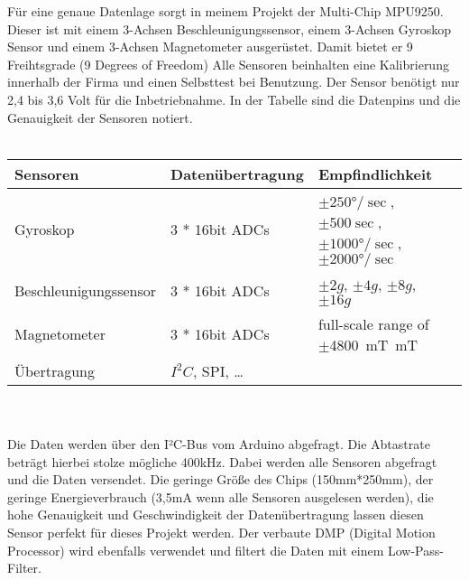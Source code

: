 Für eine genaue Datenlage sorgt in meinem Projekt der Multi-Chip MPU9250. Dieser ist mit 
einem 3-Achsen Beschleunigungssensor, einem 3-Achsen Gyroskop Sensor und einem 3-Achsen 
Magnetometer ausgerüstet. Damit bietet er 9 Freihtsgrade (9 Degrees of Freedom)
Alle Sensoren beinhalten eine Kalibrierung innerhalb der 
Firma und einen Selbsttest bei Benutzung. Der Sensor benötigt nur 2,4 bis 3,6 Volt für die 
Inbetriebnahme. In der Tabelle sind die Datenpins und die Genauigkeit der Sensoren notiert.\\
\\
\begin{tabularx}{0.8\textwidth}{l|X|XX}
Sensoren & Datenübertragung & Empfindlichkeit                                     \\
\hline
Gyroskop & 3 * 16bit ADCs & $\pm250°/\sec$, $\pm500\sec$, $\pm1000°/\sec$, $\pm2000°/\sec$\\ 
\hline
Beschleunigungssensor & 3 * 16bit ADCs & $\pm2g$, $\pm4g$, $\pm8g$, $\pm16g$\\
\hline
Magnetometer & 3 * 16bit ADCs & full-scale range of $\pm$\SI{4800}{\milli\tesla\meter}T \\
\hline
Übertragung & $I^2C$, SPI, \dots & \\
\end{tabularx}
\\
\\
Die Daten werden über den I²C-Bus vom Arduino abgefragt. Die Abtastrate beträgt hierbei 
stolze mögliche 400kHz. Dabei werden alle Sensoren abgefragt und die Daten versendet.
Die geringe Größe des Chips (150mm*250mm), der geringe Energieverbrauch (3,5mA wenn 
alle Sensoren ausgelesen werden), die hohe Genauigkeit und Geschwindigkeit der 
Datenübertragung lassen diesen Sensor perfekt für dieses Projekt werden. Der verbaute
DMP (Digital Motion Processor) wird ebenfalls verwendet und filtert die Daten mit einem
Low-Pass-Filter.

